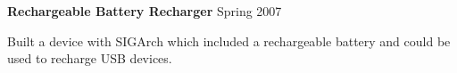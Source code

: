 \textbf{Rechargeable Battery Recharger} \hfill Spring 2007
\begin{description}
\item Built a device with SIGArch which included a rechargeable 
battery and could be used to recharge USB devices.
\end{description}

